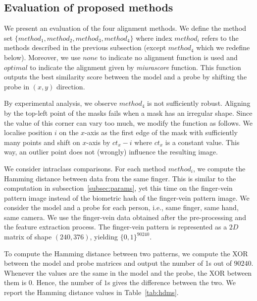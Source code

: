 \subsection{Evaluation of proposed methods}
We present an evaluation of the four alignment methods.
We define the method set $\{method_1, method_2, method_3, method_4\}$ where index $method_{i}$ refers to the methods described in the previous subsection (except $method_4$ which we redefine below). Moreover, we use $none$ to indicate no alignment function is used and $optimal$ to indicate the alignment given by \textit{miurascore} function. This function outputs the best similarity score between the model and a probe by shifting the probe in $(x,y)$ direction.

By experimental analysis, we observe $method_4$ is not sufficiently robust. Aligning by the top-left point of the masks fails when a mask has an irregular shape. Since the value of this corner can vary too much, we modify the function as follows. We localise position $i$ on the $x$-axis as the first edge of the mask with sufficiently many points and shift on $x$-axis by $ct_x - i$ where $ct_x$ is a constant value.
This way, an outlier point does not (wrongly) influence the resulting image.

We consider intraclass comparisons. For each method $method_i$, we compute the Hamming distance between data from the same finger. 
This is similar to the computation in subsection~\ref{subsec:params}, yet this time on the finger-vein pattern image instead of the biometric hash of the finger-vein pattern image.
We consider the model and a probe for each person, i.e., same finger, same hand, same camera.
We use the finger-vein data obtained after the pre-processing and the feature extraction process. The finger-vein pattern is represented as a $2D$ matrix of shape $(240, 376)$, yielding $\{0,1\}^{90240}$.

To compute the Hamming distance between two patterns, we compute the XOR between the model and probe matrices and output the number of 1s out of $90240$. Whenever the values are the same in the model and the probe, the XOR between them is $0$. Hence, the number of $1$s gives the difference between the two. 
We report the Hamming distance values in Table~\ref{tab:hdms}.

